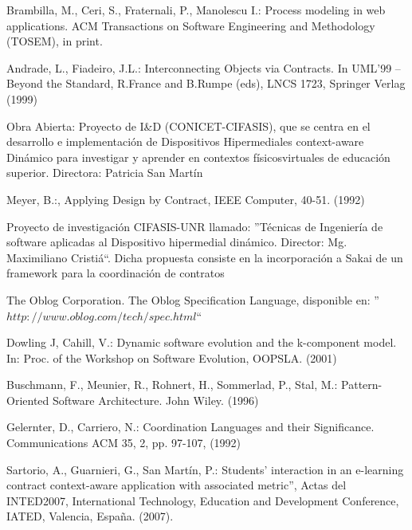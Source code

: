 \begin{thebibliography}{1}
Brambilla,  M., Ceri, S., Fraternali, P., Manolescu I.: {Process modeling in web
applications. ACM Transactions on Software Engineering and Methodology
(TOSEM), in print.}


Andrade, L., Fiadeiro, J.L.: {Interconnecting Objects via Contracts. 
In UML'99 – Beyond the Standard, R.France and B.Rumpe (eds), LNCS 1723,
Springer Verlag (1999)}

{Obra Abierta: Proyecto de I\&D (CONICET-CIFASIS), que se centra en el
desarrollo e implementación de Dispositivos Hipermediales context-aware Dinámico
para investigar y aprender en contextos físicos\-virtuales de educación
superior. Directora: Patricia San Martín}

Meyer, B.:, {Applying Design by Contract, IEEE Computer, 40-51. (1992)}


{Proyecto de investigación CIFASIS-UNR llamado: ''Técnicas de Ingeniería de
software aplicadas al Dispositivo hipermedial dinámico. Director: Mg.
Maximiliano Cristiá``}. Dicha propuesta consiste en la incorporación a Sakai de
un framework para la coordinación de contratos \cite{fiadeiro,tc}

The Oblog Corporation. {The Oblog Specification Language, disponible en:
''$http://www.oblog.com/tech/spec.html$``}

Dowling J, Cahill, V.: {Dynamic software evolution and the k-component model.
In: Proc. of the Workshop on Software Evolution, OOPSLA. (2001)}


Buschmann, F., Meunier, R., Rohnert, H., Sommerlad, P., Stal, M.: Pattern-
Oriented Software Architecture. John Wiley. (1996)




Gelernter, D., Carriero, N.: {Coordination Languages and their
Significance. Communications ACM 35, 2, pp. 97-107, (1992)}


Sartorio, A., Guarnieri, G., San Martín,  P.: {Students’ interaction in an
e-learning
contract context-aware application with associated metric”, Actas del
INTED2007, International Technology, Education and Development Conference,
IATED, Valencia, España. (2007).}


\end{thebibliography}
